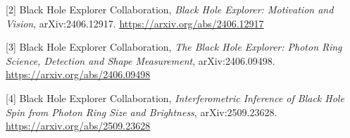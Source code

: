 \documentclass[10pt,letterpaper,twocolumn]{article}
\begin{document}
\noindent{}\hypertarget{ref-2}{}{[}2{]} Black Hole Explorer Collaboration,
\emph{Black Hole Explorer: Motivation and Vision}, arXiv:2406.12917.
\url{https://arxiv.org/abs/2406.12917}

\noindent{}\hypertarget{ref-3}{}{[}3{]} Black Hole Explorer Collaboration,
\emph{The Black Hole Explorer: Photon Ring Science, Detection and Shape Measurement},
arXiv:2406.09498. \url{https://arxiv.org/abs/2406.09498}

\noindent{}\hypertarget{ref-4}{}{[}4{]} Black Hole Explorer Collaboration,
\emph{Interferometric Inference of Black Hole Spin from Photon Ring Size and Brightness},
arXiv:2509.23628. \url{https://arxiv.org/abs/2509.23628}
\end{document}
